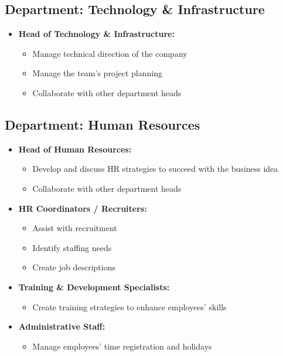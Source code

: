 \subsection{Department: Technology \& Infrastructure}
\begin{itemize}
    \item \textbf{Head of Technology \& Infrastructure:}
            \begin{itemize}
                \item Manage technical direction of the company
                \item Manage the team's project planning
                \item Collaborate with other department heads
            \end{itemize}    
\end{itemize}

\subsection{Department: Human Resources}
\begin{itemize}
    \item \textbf{Head of Human Resources:}
            \begin{itemize}
                \item Develop and discuss HR strategies to succeed with the business idea
                \item Collaborate with other department heads
            \end{itemize}
    \item \textbf{HR Coordinators / Recruiters:}
            \begin{itemize}
                \item Assist with recruitment
                \item Identify staffing needs
                \item Create job descriptions
            \end{itemize}
    \item \textbf{Training \& Development Specialists:}
            \begin{itemize}
                \item Create training strategies to enhance employees’ skills
            \end{itemize}    
    \item \textbf{Administrative Staff:}
            \begin{itemize}
                \item Manage employees' time registration and holidays
            \end{itemize}    
\end{itemize}


